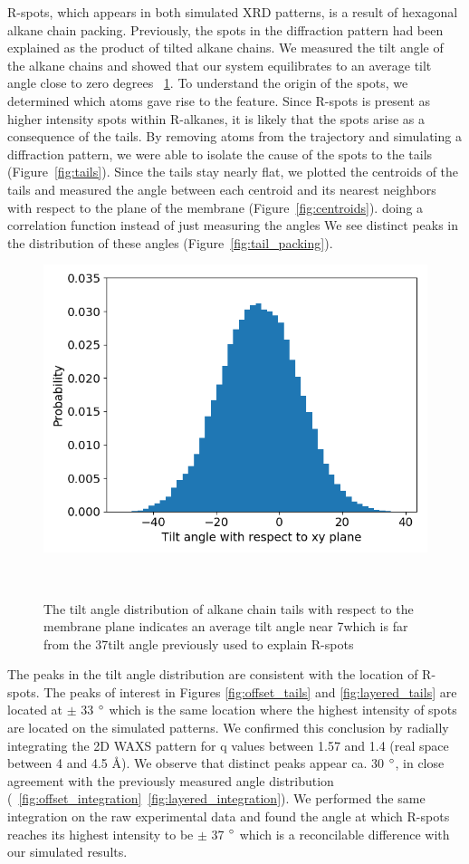 \documentclass{article}
\begin{document}
  R-spots, which appears in both simulated XRD patterns, is a result of
  hexagonal alkane chain packing. Previously, the spots in the diffraction
  pattern had been explained as the product of tilted alkane chains. We measured
  the tilt angle of the alkane chains and showed that our system equilibrates to
  an average tilt angle close to zero degrees ~\ref{fig:tilt}. To understand the
  origin of the spots, we determined which atoms gave rise to the feature. Since
  R-spots is present as higher intensity spots within R-alkanes, it is likely
  that the spots arise as a consequence of the tails. By removing atoms from the
  trajectory and simulating a diffraction pattern, we were able to isolate the
  cause of the spots to the tails (Figure~\ref{fig:tails}).  Since the tails stay
  nearly flat, we plotted the centroids of the tails and measured the angle
  between each centroid and its nearest neighbors with respect to the plane of
  the membrane (Figure~\ref{fig:centroids}).  %
  doing a correlation function instead of just measuring the angles We see
  distinct peaks in the distribution of these angles 
  (Figure~\ref{fig:tail_packing}).

  \begin{figure}
  \centering
  \includegraphics[width=0.5\linewidth]{tilt_dist.png}
  \caption{The tilt angle distribution of alkane chain tails with respect to the membrane plane
  indicates an average tilt angle near 7\degree which is far from the 37\degree tilt angle 
  previously used to explain R-spots}~\label{fig:tilt}
  \end{figure}

  The peaks in the tilt angle distribution are consistent with the location of
  R-spots. The peaks of interest in Figures \ref{fig:offset_tails} and
  \ref{fig:layered_tails} are located at $\pm$ 33 $\degree$ which is the same
  location where the highest intensity of spots are located on the simulated
  patterns. We confirmed this conclusion by radially integrating the 2D WAXS
  pattern for q values between 1.57 and 1.4 (real space between 4 and 4.5 \AA). We
  observe that distinct peaks appear ca. 30 $\degree$, in close agreement with
  the previously measured angle distribution
  (~\ref{fig:offset_integration}~\ref{fig:layered_integration}). We performed the
  same integration on the raw experimental data and found the angle at which
  R-spots reaches its highest intensity to be $\pm$ 37 $\degree$ which is a
  reconcilable difference with our simulated results.  
\end{document}
